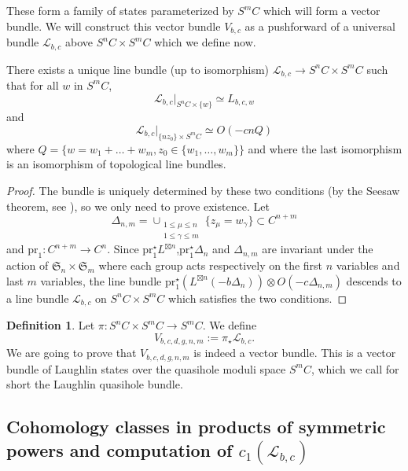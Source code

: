\documentclass{article}
\theoremstyle{definition}
\newcounter{sharedcounter}[section]
\newtheorem{definition}[sharedcounter]{Definition}
\renewcommand{\leq}{\leqslant}
\begin{document}
These form a family of states parameterized by $S^m C$ which will form a vector bundle. We will construct this vector bundle $V_{b,c}$ as a pushforward of a universal bundle $\mathcal{L}_{b,c}$ above $S^n C \times S^m C$ which we define now.

\begin{proposition}
There exists a unique line bundle (up to isomorphism) $\mathcal{L}_{b,c} \to S^n C \times S^m C$ such that for all $w$ in $S^m C$, 
$$\mathcal{L}_{b,c}|_{S^nC \times \lbrace w \rbrace}\simeq L_{b,c,w}$$
and 
$$\mathcal{L}_{b,c}|_{\lbrace nz_0 \rbrace \times S^mC} \simeq O(-c n Q)$$
where $Q=\{w=w_1+\dots+w_m,z_0\in \{w_1,\dots,w_m\}\}$ and where the last isomorphism is an isomorphism of topological line bundles.

\end{proposition}
    
\begin{proof}
The bundle is uniquely determined by these two conditions (by the Seesaw theorem, see \cite[\S 2, Corollary 6]{Mumford_1988}), so we only need to prove existence. Let $$\Delta_{n,m}=\cup_{\substack{1\leq \mu \leq n\\1\leq \gamma \leq m}} \lbrace z_\mu = w_\gamma \rbrace \subset C^{n+m}$$ and $\text{pr}_1: C^{n+m} \to  C^n$. Since $\text{pr}_1^\star L^{\boxtimes n}$,$\text{pr}_1^\star \Delta_n$ and $\Delta_{n,m}$ are invariant under the action of $\mathfrak{S}_n \times \mathfrak{S}_m$ where each group acts respectively on the first $n$ variables and last $m$ variables, the line bundle $\text{pr}_1^\star (L^{\boxtimes n}(-b\Delta_n)) \otimes O(-c\Delta_{n,m})$ descends to a line bundle $\mathcal{L}_{b,c}$ on $S^n C\times S^mC$ which satisfies the two conditions.
\end{proof}


  

\begin{definition}
Let $\pi:S^nC \times S^m C \to S^m C$.  We define $$V_{b,c,d,g,n,m}:=\pi_\star \mathcal{L}_{b,c}.$$ We are going to prove that $V_{b,c,d,g,n,m}$ is indeed a vector bundle. This is a vector bundle of Laughlin states over the quasihole moduli space $S^m C$, which we call for short the Laughlin quasihole bundle.
\end{definition}



\subsection{Cohomology classes in products of symmetric powers and computation of $c_1(\mathcal{L}_{b,c})$}
\end{document}
